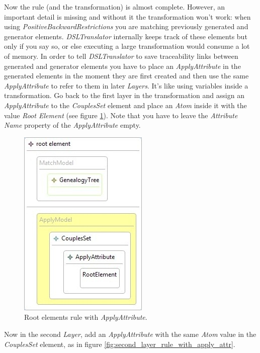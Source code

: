 Now the rule (and the transformation) is almost complete. However, an important
detail is missing and without it the transformation won't work: when using
\emph{PositiveBackwardRestrictions} you are matching previously generated and
generator elements. \emph{DSLTranslator} internally keeps track of these elements but
only if you say so, or else executing a large transformation would consume a
lot of memory. In order to tell \emph{DSLTranslator} to save traceability links between
generated and generator elements you have to place an \emph{ApplyAttribute}
in the generated elements in the moment they are first created and then use the
same \emph{ApplyAttribute} to refer to them in later \emph{Layers}. It's like
using variables inside a transformation. Go back to the first layer in the
transformation and assign an \emph{ApplyAttribute} to the \emph{CouplesSet}
element and place an \emph{Atom} inside it with the value \emph{Root Element}
(see figure \ref{fig:root_elements_match_attr}). Note that you have to leave the
\emph{Attribute Name} property of the \emph{ApplyAttribute} empty.

\begin{figure}[h]
\begin{center}
  \includegraphics[scale=0.7]{imgs/root_elements_match_attr.jpg}
  \caption{Root elements rule with \emph{ApplyAttribute}.}
  \label{fig:root_elements_match_attr}
\end{center}
\end{figure}

Now in the second \emph{Layer}, add an \emph{ApplyAttribute} with the same
\emph{Atom} value in the \emph{CouplesSet} element, as in figure
\ref{fig:second_layer_rule_with_apply_attr}.


